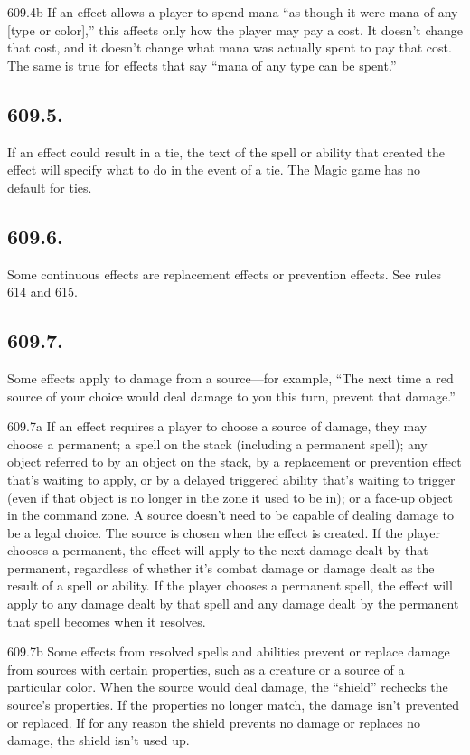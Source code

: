 609.4b If an effect allows a player to spend mana “as though it were mana of any [type or color],” this affects only how the player may pay a cost. It doesn’t change that cost, and it doesn’t change what mana was actually spent to pay that cost. The same is true for effects that say “mana of any type can be spent.”

\subsection*{609.5.}
If an effect could result in a tie, the text of the spell or ability that created the effect will specify what to do in the event of a tie. The Magic game has no default for ties.

\subsection*{609.6.}
Some continuous effects are replacement effects or prevention effects. See rules 614 and 615.

\subsection*{609.7.}
Some effects apply to damage from a source—for example, “The next time a red source of your choice would deal damage to you this turn, prevent that damage.”

609.7a If an effect requires a player to choose a source of damage, they may choose a permanent; a spell on the stack (including a permanent spell); any object referred to by an object on the stack, by a replacement or prevention effect that’s waiting to apply, or by a delayed triggered ability that’s waiting to trigger (even if that object is no longer in the zone it used to be in); or a face-up object in the command zone. A source doesn’t need to be capable of dealing damage to be a legal choice. The source is chosen when the effect is created. If the player chooses a permanent, the effect will apply to the next damage dealt by that permanent, regardless of whether it’s combat damage or damage dealt as the result of a spell or ability. If the player chooses a permanent spell, the effect will apply to any damage dealt by that spell and any damage dealt by the permanent that spell becomes when it resolves.

609.7b Some effects from resolved spells and abilities prevent or replace damage from sources with certain properties, such as a creature or a source of a particular color. When the source would deal damage, the “shield” rechecks the source’s properties. If the properties no longer match, the damage isn’t prevented or replaced. If for any reason the shield prevents no damage or replaces no damage, the shield isn’t used up.

